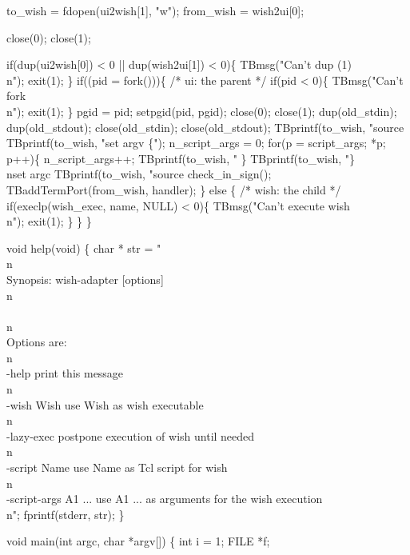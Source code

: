   to_wish = fdopen(ui2wish[1], "w");
  from_wish = wish2ui[0];

  close(0); close(1);

  if(dup(ui2wish[0]) < 0 || dup(wish2ui[1]) < 0)\{
    TBmsg("Can't dup (1)\\n"); exit(1);
  \}
  if((pid = fork()))\{
    /* ui: the parent */
    if(pid < 0)\{
      TBmsg("Can't fork\\n"); exit(1);
    \}
    pgid = pid;
    setpgid(pid, pgid);
    close(0); close(1);
    dup(old_stdin);
    dup(old_stdout);
    close(old_stdin);
    close(old_stdout);
    TBprintf(to_wish, "source %
    TBprintf(to_wish, "set argv \{");
    n_script_args = 0;
    for(p = script_args; *p; p++)\{
      n_script_args++;   
      TBprintf(to_wish, "%
    \}  
    TBprintf(to_wish, "\}\\nset argc %
    TBprintf(to_wish, "source %
    check_in_sign();
    TBaddTermPort(from_wish, handler);
  \} else \{
    /* wish: the child */
    if(execlp(wish_exec, name, NULL) < 0)\{
      TBmsg("Can't execute wish\\n");
      exit(1);
    \}
  \}
\}

void help(void)
\{
  char * str =
"\\n\\
Synopsis: wish-adapter [options]\\n\\
\\n\\
Options are:\\n\\
-help                 print this message\\n\\
-wish Wish            use Wish as wish executable\\n\\
-lazy-exec            postpone execution of wish until needed\\n\\
-script Name          use Name as Tcl script for wish\\n\\
-script-args A1 ...   use A1 ... as arguments for the wish execution\\n";
  fprintf(stderr, str);
\}

void main(int argc, char *argv[])
\{
  int i = 1;
  FILE *f;

